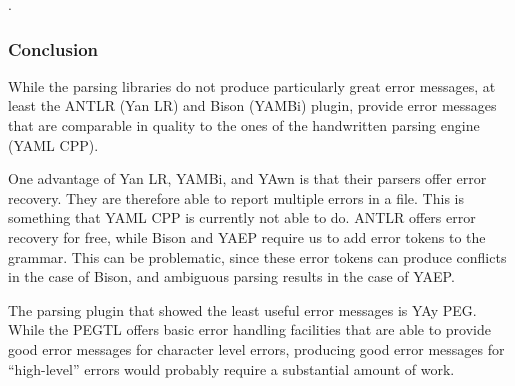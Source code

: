 .

\subsubsection{Conclusion}

While the parsing libraries do not produce particularly great error messages, at least the ANTLR (Yan LR) and Bison (YAMBi) plugin, provide error messages that are comparable in quality to the ones of the handwritten parsing engine (YAML CPP).

One advantage of Yan LR, YAMBi, and YAwn is that their parsers offer error recovery. They are therefore able to report multiple errors in a file. This is something that YAML CPP is currently not able to do. ANTLR offers error recovery for free, while Bison and YAEP require us to add error tokens to the grammar. This can be problematic, since these error tokens can produce conflicts in the case of Bison, and ambiguous parsing results in the case of YAEP.

The parsing plugin that showed the least useful error messages is YAy PEG. While the PEGTL offers basic error handling facilities that are able to provide good error messages for character level errors, producing good error messages for “high-level” errors would probably require a substantial amount of work.
